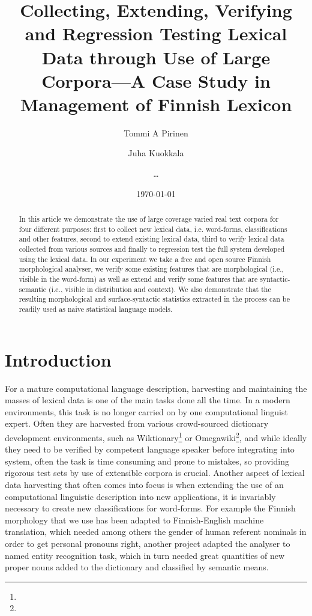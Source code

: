 \documentclass[a5paper]{article}
\title{Collecting, Extending, Verifying and Regression Testing Lexical Data through
Use of Large Corpora---A Case Study in Management of Finnish Lexicon}
\author{Tommi A Pirinen \and Juha Kuokkala \and \ldots}
\date{\today}
\begin{document}
\maketitle

\begin{abstract}
    In this article we demonstrate the use of large coverage varied real text
    corpora for four different purposes: first to collect new lexical data, i.e.
    word-forms, classifications and other features, second to extend existing
    lexical data, third to verify lexical data collected from various sources
    and finally to regression test the full system developed using the lexical
    data. In our experiment we take a free and open source Finnish morphological
    analyser, we verify some existing features that are morphological (i.e.,
    visible in the word-form) as well as  extend and verify some features that
    are syntactic-semantic (i.e., visible in distribution and context). We
    also demonstrate that the resulting morphological and surface-syntactic
    statistics extracted in the process can be readily used as naive statistical
    language models.
\end{abstract}

\section{Introduction}
\label{sec:introduction}

For a mature computational language description, harvesting and maintaining the
masses of lexical data is one of the main tasks done all the time. In a
modern environments, this task is no longer carried on by one computational
linguist expert. Often they are harvested from various crowd-sourced dictionary
development environments, such as Wiktionary\footnote{} or O\-mega\-wi\-ki\footnote{},
and while ideally they need to be verified by competent language speaker before
integrating into system, often the task is time consuming and prone to mistakes,
so providing rigorous test sets by use of extensible corpora is crucial. Another
aspect of lexical data harvesting that often comes into focus is when extending
the use of an computational linguistic description into new applications, it
is invariably necessary to create new classifications for word-forms. For
example the Finnish morphology that we use has been adapted to Finnish-English
machine translation, which needed among others the gender of human referent
nominals in order to get personal pronouns right, another project adapted the
analyser to named entity recognition task, which in turn needed great quantities
of new proper nouns added to the dictionary and classified by semantic means.
\end{document}
